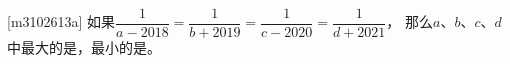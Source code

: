 [m3102613a]\quad
如果$\dfrac{1}{a-2018}=\dfrac{1}{b+2019}=\dfrac{1}{c-2020}=\dfrac{1}{d+2021}$，
那么$a$、$b$、$c$、$d$中最大的是，最小的是。
\par